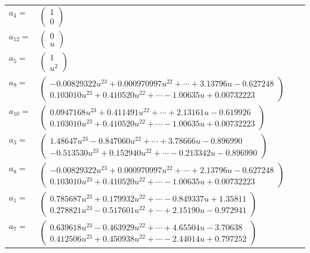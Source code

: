 \documentclass[1p]{elsarticle_modified}
\theoremstyle{definition}
\begin{document}
\begin{tabular}{m{7pt} m{180pt} m{7pt} m{180pt} }
\flushright $a_{4}=$&$\begin{pmatrix}1\\0\end{pmatrix}$ \\
\flushright $a_{12}=$&$\begin{pmatrix}0\\u\end{pmatrix}$ \\
\flushright $a_{5}=$&$\begin{pmatrix}1\\u^2\end{pmatrix}$ \\
\flushright $a_{9}=$&$\begin{pmatrix}-0.00829322 u^{23}+0.000970997 u^{22}+\cdots+3.13796 u-0.627248\\0.103010 u^{23}+0.410520 u^{22}+\cdots-1.00635 u+0.00732223\end{pmatrix}$ \\
\flushright $a_{10}=$&$\begin{pmatrix}0.0947168 u^{23}+0.411491 u^{22}+\cdots+2.13161 u-0.619926\\0.103010 u^{23}+0.410520 u^{22}+\cdots-1.00635 u+0.00732223\end{pmatrix}$ \\
\flushright $a_{3}=$&$\begin{pmatrix}1.48647 u^{23}-0.847060 u^{22}+\cdots+3.78666 u-0.896990\\-0.513530 u^{23}+0.152940 u^{22}+\cdots-0.213342 u-0.896990\end{pmatrix}$ \\
\flushright $a_{8}=$&$\begin{pmatrix}-0.00829322 u^{23}+0.000970997 u^{22}+\cdots+2.13796 u-0.627248\\0.103010 u^{23}+0.410520 u^{22}+\cdots-1.00635 u+0.00732223\end{pmatrix}$ \\
\flushright $a_{1}=$&$\begin{pmatrix}0.785687 u^{23}+0.179932 u^{22}+\cdots-0.849337 u+1.35811\\0.278821 u^{23}-0.517601 u^{22}+\cdots+2.15190 u-0.972941\end{pmatrix}$ \\
\flushright $a_{7}=$&$\begin{pmatrix}0.639618 u^{23}-0.463929 u^{22}+\cdots+4.65504 u-3.70638\\0.412506 u^{23}+0.450938 u^{22}+\cdots-2.44014 u+0.797252\end{pmatrix}$ \\

\end{tabular}
\end{document}
